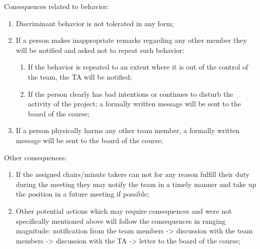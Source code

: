 Consequences related to behavior:
\begin{enumerate}
    \item Discriminant behavior is not tolerated in any form;
    \item If a person makes inappropriate remarks regarding any other member they will be notified and asked not to repeat such behavior:
    \begin{enumerate}
        \item If the behavior is repeated to an extent where it is out of the control of the team, the TA will be notified;
        \item If the person clearly has bad intentions or continues to disturb the activity of the project; a formally written message will be sent to the board of the course;
    \end{enumerate}
    \item If a person physically harms any other team member, a formally written message will be sent to the board of the course;
\end{enumerate}
Other consequences:
\begin{enumerate}
\item If the assigned chairs/minute takers can not for any reason fulfill their duty during the meeting they may notify the team in a timely manner and take up the position in a future meeting if possible;
\item Other potential actions which may require consequences and were not specifically mentioned above will follow the consequences in ranging magnitude: notification from the team members -> discussion with the team members -> discussion with the TA -> letter to the board of the course;
\end{enumerate}
\par
